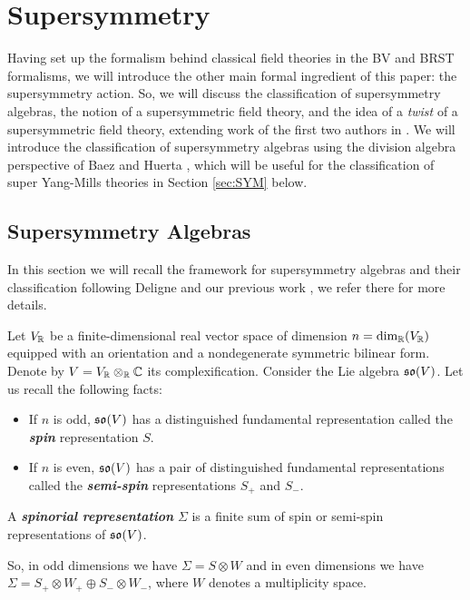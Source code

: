 \documentclass[10pt, oneside]{article}
\newcommand{\defterm}[1]{\textbf{\emph{#1}}}
\begin{document}
\section{Supersymmetry} \label{sec: susy}
Having set up the formalism behind classical field theories in the BV and BRST formalisms, we will introduce the other main formal ingredient of this paper: the supersymmetry action.  So, we will discuss the classification of supersymmetry algebras, the notion of a supersymmetric field theory, and the idea of a \emph{twist} of a supersymmetric field theory, extending work of the first two authors in \cite{ElliottSafronov}.  We will introduce the classification of supersymmetry algebras using the division algebra perspective of Baez and Huerta \cite{BaezHuerta}, which will be useful for the classification of super Yang-Mills theories in Section \ref{sec:SYM} below.

\subsection{Supersymmetry Algebras} \label{sec:susyalgebras}
In this section we will recall the framework for supersymmetry algebras and their classification following Deligne \cite{DeligneSpinors} and our previous work \cite{ElliottSafronov}, we refer there for more details.

Let $V_\mathbb R$ be a finite-dimensional real vector space of dimension $n=\dim_\mathbb R(V_\mathbb R)$ equipped with an orientation and a nondegenerate symmetric bilinear form. Denote by $V=V_\mathbb R\otimes_\mathbb R\mathbb C$ its complexification. Consider the Lie algebra $\mathfrak{so}(V)$. Let us recall the following facts:
\begin{itemize}
\item If $n$ is odd, $\mathfrak{so}(V)$ has a distinguished fundamental representation called the \defterm{spin} representation $S$.

\item If $n$ is even, $\mathfrak{so}(V)$ has a pair of distinguished fundamental representations called the \defterm{semi-spin} representations $S_+$ and $S_-$.
\end{itemize}

\begin{definition}
A \defterm{spinorial representation} $\Sigma$ is a finite sum of spin or semi-spin representations of $\mathfrak{so}(V)$.
\end{definition}

So, in odd dimensions we have $\Sigma=S\otimes W$ and in even dimensions we have $\Sigma=S_+\otimes W_+\oplus S_-\otimes W_-$, where $W$ denotes a multiplicity space.
\end{document}
